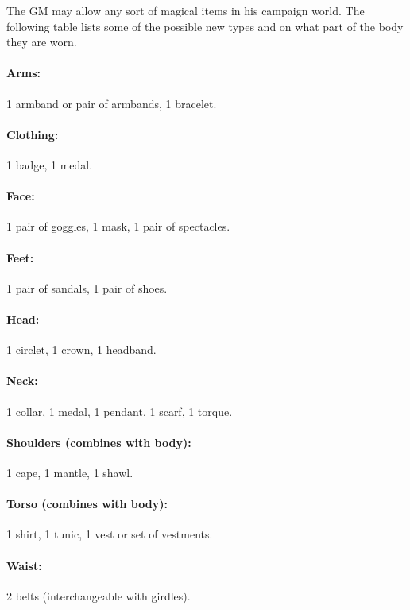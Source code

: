 \begin{multicols}{2}
\vspace{1em}
 
The GM may allow any sort of magical items in his campaign world.  The following table lists some of the possible new types and on what part of the body they are worn.

\paragraph{Arms:} 1 armband or pair of armbands, 1 bracelet.

\paragraph{Clothing:} 1 badge, 1 medal.

\paragraph{Face:} 1 pair of goggles, 1 mask, 1 pair of spectacles.

\paragraph{Feet:} 1 pair of sandals, 1 pair of shoes.

\paragraph{Head:} 1 circlet, 1 crown, 1 headband.

\paragraph{Neck:} 1 collar, 1 medal, 1 pendant, 1 scarf, 1 torque.

\paragraph{Shoulders (combines with body):} 1 cape, 1 mantle, 1 shawl.

\paragraph{Torso (combines with body):} 1 shirt, 1 tunic, 1 vest or set of vestments.

\paragraph{Waist:} 2 belts (interchangeable with girdles).


\end{multicols}
